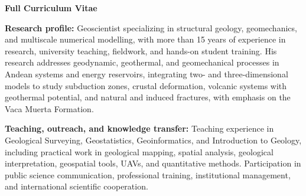 \newpage
\begin{center}
  {\fontsize{18pt}{21pt}\bodyfont\bfseries\color{darktext} Full Curriculum Vitae}
\end{center}
\vspace{-1mm}

\begin{cvparagraph}
\textbf{Research profile:} Geoscientist specializing in structural geology, geomechanics, and multiscale numerical modelling, with more than 15 years of experience in research, university teaching, fieldwork, and hands-on student training. His research addresses geodynamic, geothermal, and geomechanical processes in Andean systems and energy reservoirs, integrating two- and three-dimensional models to study subduction zones, crustal deformation, volcanic systems with geothermal potential, and natural and induced fractures, with emphasis on the Vaca Muerta Formation.

\textbf{Teaching, outreach, and knowledge transfer:} Teaching experience in Geological Surveying, Geostatistics, Geoinformatics, and Introduction to Geology, including practical work in geological mapping, spatial analysis, geological interpretation, geospatial tools, UAVs, and quantitative methods. Participation in public science communication, professional training, institutional management, and international scientific cooperation.
\end{cvparagraph}

\begin{cventries}
\end{cventries}

